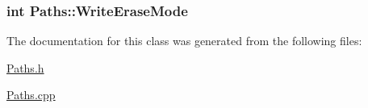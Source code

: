 \label{classPaths_a8ed757e23d6850088af1fb98f50f9f92}
\hypertarget{classPaths_ad26ddb9106389428f3ba4cd0cd7eb77a}{
\subsubsection[{WriteEraseMode}]{\setlength{\rightskip}{0pt plus 5cm}int {\bf Paths::WriteEraseMode}}}
\label{classPaths_ad26ddb9106389428f3ba4cd0cd7eb77a}


The documentation for this class was generated from the following files:\begin{DoxyCompactItemize}
\item 
\hyperlink{Paths_8h}{Paths.h}\item 
\hyperlink{Paths_8cpp}{Paths.cpp}\end{DoxyCompactItemize}
